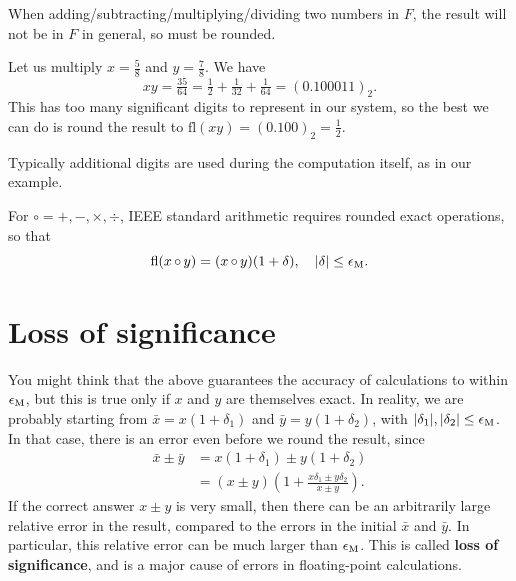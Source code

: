 \documentclass[
  letterpaper,
  DIV=11,
  numbers=noendperiod]{scrreprt}
\begin{document}
When adding/subtracting/multiplying/dividing two numbers in \(F\), the
result will not be in \(F\) in general, so must be rounded.

Let us multiply \(x=\tfrac58\) and \(y=\tfrac78\). We have \[
xy = \tfrac{35}{64} = \tfrac12 + \tfrac1{32} + \tfrac1{64} = (0.100011)_2.
\] This has too many significant digits to represent in our system, so
the best we can do is round the result to
\(\mathrm{fl}(xy) = (0.100)_2 = \tfrac12\).

\begin{tcolorbox}[enhanced jigsaw, toptitle=1mm, breakable, colbacktitle=quarto-callout-note-color!10!white, colback=white, opacitybacktitle=0.6, rightrule=.15mm, bottomrule=.15mm, left=2mm, arc=.35mm, bottomtitle=1mm, title=\textcolor{quarto-callout-note-color}{\faInfo}\hspace{0.5em}{Note}, titlerule=0mm, toprule=.15mm, leftrule=.75mm, opacityback=0, colframe=quarto-callout-note-color-frame, coltitle=black]

Typically additional digits are used during the computation itself, as
in our example.

\end{tcolorbox}

For \({\circ} = +,-,\times, \div\), IEEE standard arithmetic requires
rounded exact operations, so that \[
\mathrm{fl}(x {\,\circ\,} y) = (x {\,\circ\,} y)(1+\delta), \quad |\delta|\leq\epsilon_{\rm M}.
\]

\section{Loss of significance}\label{loss-of-significance}

You might think that the above guarantees the accuracy of calculations
to within \(\epsilon_{\rm M}\), but this is true only if \(x\) and \(y\)
are themselves exact. In reality, we are probably starting from
\(\bar{x}=x(1+\delta_1)\) and \(\bar{y}=y(1 + \delta_2)\), with
\(|\delta_1|, |\delta_2| \leq \epsilon_{\rm M}\). In that case, there is
an error even before we round the result, since \[
\begin{aligned}
\bar{x} \pm \bar{y} &= x(1+ \delta_1) \pm y(1 + \delta_2)\\
&= (x\pm y)\left(1 + \frac{x\delta_1 \pm y\delta_2}{x\pm y}\right).
\end{aligned}
\] If the correct answer \(x\pm y\) is very small, then there can be an
arbitrarily large relative error in the result, compared to the errors
in the initial \(\bar{x}\) and \(\bar{y}\). In particular, this relative
error can be much larger than \(\epsilon_{\rm M}\). This is called
\textbf{loss of significance}, and is a major cause of errors in
floating-point calculations.
\end{document}
